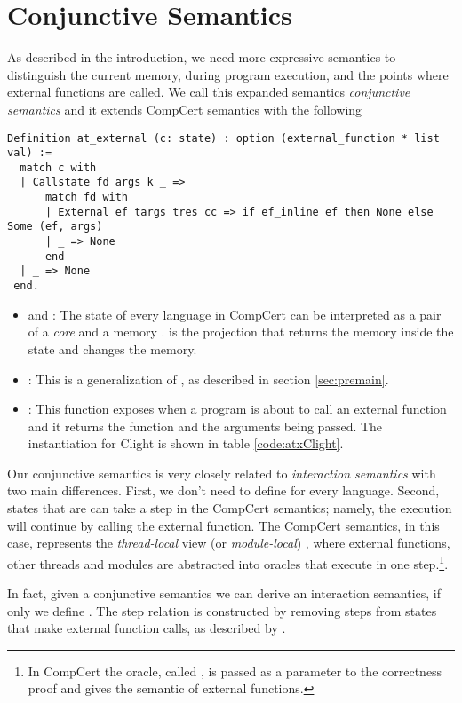\section{Conjunctive Semantics}\label{sec:compcert-sem}

As described in the introduction, we need more expressive semantics to distinguish the current memory, during program execution, and the points where external functions are called. We call this expanded semantics \emph{conjunctive semantics} and it extends CompCert semantics with the following

\begin{table}
\begin{lstlisting}
Definition at_external (c: state) : option (external_function * list val) :=
  match c with
  | Callstate fd args k _ =>
      match fd with
      | External ef targs tres cc => if ef_inline ef then None else Some (ef, args)
      | _ => None
      end
  | _ => None
 end.
\end{lstlisting}
\caption{ definition for Clight. The function checks that 
(1) the current state is about to make a function call, 
(2) that the function is an External function and, 
(3) that the external function cannot be inlined (The compiler is allowed to inline specific functions such as  and certain builtins). }\label{code:atxClight}
\end{table}


\begin{itemize}
\item {} and : The state of every language in CompCert can be interpreted as a pair of a \emph{core} and a memory \cite{compcomp}.  is the projection that returns the memory inside the state and  changes the memory.
\item {}: This is a generalization of , as described in section \ref{sec:premain}.
\item  {} : This function exposes when a program is about to call an external function and it returns the function and the arguments being passed. The instantiation for Clight is shown in table \ref{code:atxClight}.
\end{itemize}    

Our conjunctive semantics is very closely related to \emph{interaction semantics} \cite{compcomp} with two main differences. First, we don't need to define  for every language. Second, states that are  can take a step in the CompCert semantics; namely, the execution will continue by calling the external function. The CompCert semantics, in this case, represents the \emph{thread-local} view (or \emph{module-local}) , where external functions, other threads and modules are abstracted into oracles that execute in one step.\footnote{In CompCert the oracle, called , is passed as a parameter to the correctness proof and gives the semantic of external functions.}. 

In fact, given a conjunctive semantics we can derive an interaction semantics, if only we define . The step relation is constructed by removing steps from states that make external function calls, as described by . 